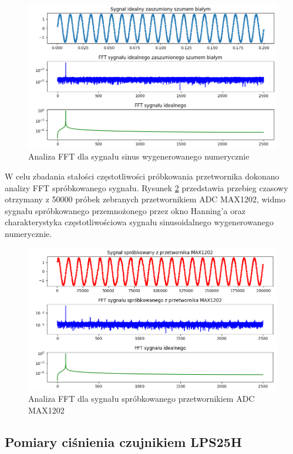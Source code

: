 \begin{figure}[H]

	\centering
		\includegraphics[width=14cm]{sin_fft_ideal}
	\caption{Analiza FFT dla sygnału sinus wygenerowanego numerycznie} 
	\label{fig:sin_fft_ideal}
\end{figure}

W celu zbadania stałości częstotliwości próbkowania przetwornika dokonano analizy FFT spróbkowanego sygnału. Rysunek \ref{fig:sin_fft_max1202} przedstawia przebieg czasowy otrzymany z 50000 próbek zebranych przetwornikiem ADC MAX1202, widmo sygnału spróbkowanego przemnożonego przez okno Hanning'a oraz charakterystyka częstotliwościowa sygnału sinusoidalnego wygenerowanego numerycznie.


\begin{figure}[H]
		\includegraphics[width=14cm]{sin_fft_max1202}
	\caption{Analiza FFT dla sygnału spróbkowanego przetwornikiem ADC MAX1202} 
	\label{fig:sin_fft_max1202}
\end{figure}

\subsection{Pomiary ciśnienia czujnikiem LPS25H}

